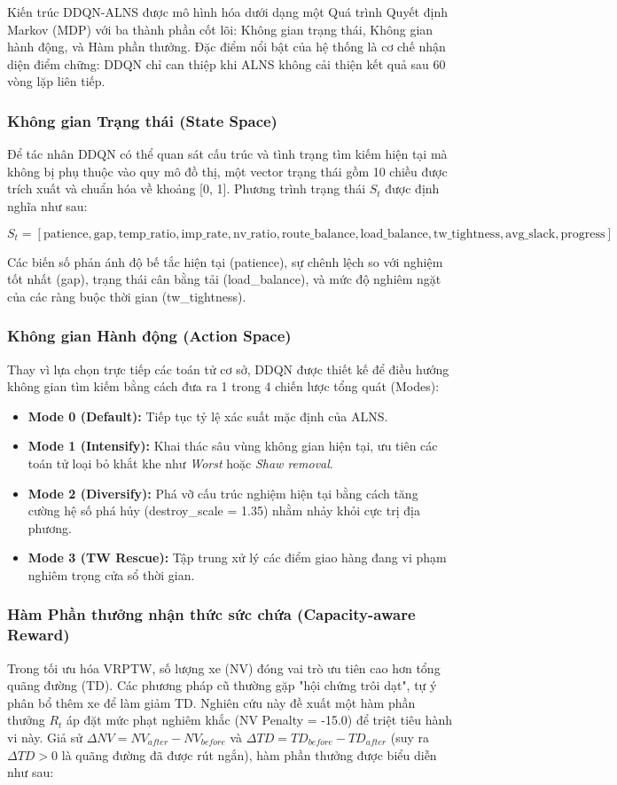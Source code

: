 \documentclass[13pt, a4paper]{extarticle} %
\begin{document}
Kiến trúc DDQN-ALNS được mô hình hóa dưới dạng một Quá trình Quyết định Markov (MDP) với ba thành phần cốt lõi: Không gian trạng thái, Không gian hành động, và Hàm phần thưởng. Đặc điểm nổi bật của hệ thống là cơ chế nhận diện điểm chững: DDQN chỉ can thiệp khi ALNS không cải thiện kết quả sau 60 vòng lặp liên tiếp.

\subsubsection{Không gian Trạng thái (State Space)}
Để tác nhân DDQN có thể quan sát cấu trúc và tình trạng tìm kiếm hiện tại mà không bị phụ thuộc vào quy mô đồ thị, một vector trạng thái gồm 10 chiều được trích xuất và chuẩn hóa về khoảng [0, 1]. Phương trình trạng thái $S_t$ được định nghĩa như sau:

\[
S_t = \left[ \text{patience}, \text{gap}, \text{temp\_ratio}, \text{imp\_rate}, \text{nv\_ratio}, \text{route\_balance}, \text{load\_balance}, \text{tw\_tightness}, \text{avg\_slack}, \text{progress} \right]
\]

Các biến số phản ánh độ bế tắc hiện tại (patience), sự chênh lệch so với nghiệm tốt nhất (gap), trạng thái cân bằng tải (load\_balance), và mức độ nghiêm ngặt của các ràng buộc thời gian (tw\_tightness).

\subsubsection{Không gian Hành động (Action Space)}
Thay vì lựa chọn trực tiếp các toán tử cơ sở, DDQN được thiết kế để điều hướng không gian tìm kiếm bằng cách đưa ra 1 trong 4 chiến lược tổng quát (Modes):
\begin{itemize}
    \item \textbf{Mode 0 (Default):} Tiếp tục tỷ lệ xác suất mặc định của ALNS.
    \item \textbf{Mode 1 (Intensify):} Khai thác sâu vùng không gian hiện tại, ưu tiên các toán tử loại bỏ khắt khe như \textit{Worst} hoặc \textit{Shaw removal}.
    \item \textbf{Mode 2 (Diversify):} Phá vỡ cấu trúc nghiệm hiện tại bằng cách tăng cường hệ số phá hủy (destroy\_scale = 1.35) nhằm nhảy khỏi cực trị địa phương.
    \item \textbf{Mode 3 (TW Rescue):} Tập trung xử lý các điểm giao hàng đang vi phạm nghiêm trọng cửa sổ thời gian.
\end{itemize}

\subsubsection{Hàm Phần thưởng nhận thức sức chứa (Capacity-aware Reward)}
Trong tối ưu hóa VRPTW, số lượng xe (NV) đóng vai trò ưu tiên cao hơn tổng quãng đường (TD). Các phương pháp cũ thường gặp "hội chứng trôi dạt", tự ý phân bổ thêm xe để làm giảm TD. Nghiên cứu này đề xuất một hàm phần thưởng $R_t$ áp đặt mức phạt nghiêm khắc (NV Penalty = -15.0) để triệt tiêu hành vi này. Giả sử $\Delta NV = NV_{after} - NV_{before}$ và $\Delta TD = TD_{before} - TD_{after}$ (suy ra $\Delta TD > 0$ là quãng đường đã được rút ngắn), hàm phần thưởng được biểu diễn như sau:
\end{document}

